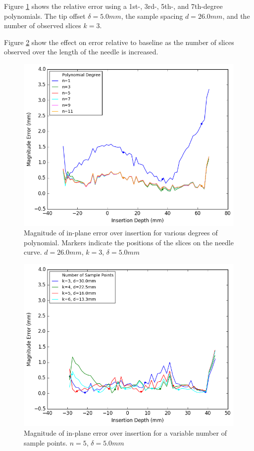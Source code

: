 Figure \ref{fig:results_error_comparison} shows the relative error using a 1st-, 3rd-, 5th-, and 7th-degree polynomials. The tip offset $\delta=5.0mm$, the sample spacing $d=26.0mm$, and the number of observed slices $k=3$. 

Figure \ref{fig:results_sample_comparison} show the effect on error relative to baseline as the number of slices observed over the length of the needle is increased. 

\begin{figure}[h]
\includegraphics[width=1.0\textwidth]{Fig/chap5/errors_polynomials_3_samples.png}
\caption{Magnitude of in-plane error over insertion for various degrees of polynomial. Markers indicate the positions of the slices on the needle curve. $d=26.0mm$, $k=3$, $\delta=5.0mm$}
\label{fig:results_error_comparison}
\end{figure}

\begin{figure}[h]
\includegraphics[width=1.0\textwidth]{Fig/chap5/errors_more_samples.png}
\caption{Magnitude of in-plane error over insertion for a variable number of sample points. $n=5$, $\delta=5.0mm$}
\label{fig:results_sample_comparison}
\end{figure}

